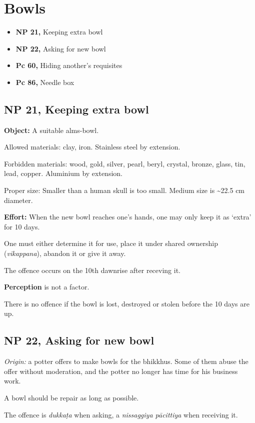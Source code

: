 \chapter{Bowls}

\begin{itemize}
\tightlist
\item
  \textbf{NP 21,} Keeping extra bowl
\item
  \textbf{NP 22,} Asking for new bowl
\item
  \textbf{Pc 60,} Hiding another's requisites
\item
  \textbf{Pc 86,} Needle box
\end{itemize}

\section{NP 21, Keeping extra bowl}

\textbf{Object:} A suitable alms-bowl.

Allowed materials: clay, iron. Stainless steel by extension.

Forbidden materials: wood, gold, silver, pearl, beryl, crystal, bronze,
glass, tin, lead, copper. Aluminium by extension.

Proper size: Smaller than a human skull is too small. Medium size is
\textasciitilde22.5 cm diameter.

\textbf{Effort:} When the new bowl reaches one's hands, one may only
keep it as `extra' for 10 days.

One must either determine it for use, place it under shared ownership
(\emph{vikappana}), abandon it or give it away.

The offence occurs on the 10th dawnrise after receving it.

\textbf{Perception} is not a factor.

There is no offence if the bowl is lost, destroyed or stolen before the
10 days are up.

\section{NP 22, Asking for new bowl}

\emph{Origin:} a potter offers to make bowls for the bhikkhus. Some of
them abuse the offer without moderation, and the potter no longer has
time for his business work.

A bowl should be repair as long as possible.

The offence is \emph{dukkaṭa} when asking, a \emph{nissaggiya pācittiya}
when receiving it.

